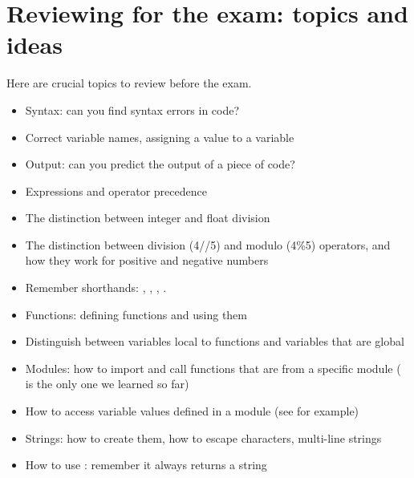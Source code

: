 \documentclass[letterpaper,10pt,english]{sphinxmanual}
\begin{document}
\section{Reviewing for the exam:  topics and ideas}
\label{\detokenize{lecture_notes/lec07_modules_images:reviewing-for-the-exam-topics-and-ideas}}
Here are crucial topics to review before the exam.
\begin{itemize}
\item {} 
Syntax: can you find syntax errors in code?

\item {} 
Correct variable names, assigning a value to a variable

\item {} 
Output: can you predict the output of a piece of code?

\item {} 
Expressions and operator precedence

\item {} 
The distinction between integer and float division

\item {} 
The distinction between division (4//5) and modulo (4\%5) operators,
and how they work for positive and negative numbers

\item {} 
Remember shorthands: \sphinxcode{\sphinxupquote{+=}}, \sphinxcode{\sphinxupquote{-=}}, \sphinxcode{\sphinxupquote{/=}}, \sphinxcode{\sphinxupquote{*=}}.

\item {} 
Functions: defining functions and using them

\item {} 
Distinguish between variables local to functions and variables that
are global

\item {} 
Modules: how to import and call functions that are from a specific
module ( is the only one we learned so far)

\item {} 
How to access variable values defined in a module (see 
for example)

\item {} 
Strings: how to create them, how to escape characters, multi-line strings

\item {} 
How to use : remember it always returns a string


\end{itemize}
\end{document}
